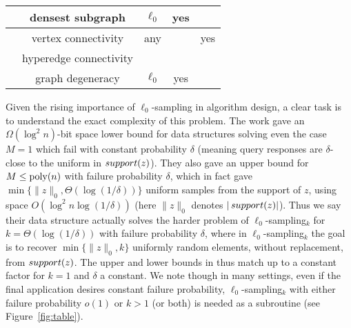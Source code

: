 \begin{figure*}[t]
\begin{center}
\begin{tabular}{|c|c|c|c|c|}
\hline
\cite{EsfandiariHW16} & densest subgraph & $\ell_0$ & yes & \\
\hline
\cite{GuhaMT15} & vertex connectivity & any & & yes\\
 & hyperedge connectivity &  & & \\
\hline
\cite{FarachColtonT16} & graph degeneracy & $\ell_0$ & yes & \\
\hline
\end{tabular}
\caption{Guarantees needed by various works using samplers as subroutines. The last two columns indicate whether the work needs to use a sampler that returns $k$ samples at a time when queried for some $k>1$, or for some subconstant failure probability $\delta$ even to achieve failure probability $1/3$ in the main application. The ``distribution'' column indicates the output distribution needed from the sampler for the application (``any'' means a \suppfind{} subroutine is sufficient, i.e.\ it suffices for a query to return any index $i$ for which $z_i\neq 0$).}\label{fig:table}
\end{center}
\end{figure*}

Given the rising importance of $\ell_0$-sampling in algorithm design, a clear task is to understand the exact complexity of this problem. The work \cite{JowhariST11} gave an $\Omega(\log^2 n)$-bit space lower bound for data structures solving even the case $M=1$ which fail with constant probability $\delta$ (meaning query responses are $\delta$-close to the uniform in $\mathop{support}(z)$). They also gave an upper bound for $M \le {\mathrm{poly}}(n)$ with failure probability $\delta$, which in fact gave $\min\{\|z\|_0, \Theta(\log(1/\delta))\}$ uniform samples from the support of $z$, using space $O(\log^2 n \log(1/\delta))$ (here $\|z\|_0$ denotes $|\mathop{support}(z)|$). Thus we say their data structure actually solves the harder problem of $\ell_0$-sampling$_k$ for $k =\Theta(\log(1/\delta))$ with failure probability $\delta$, where in $\ell_0$-sampling$_k$ the goal is to recover $\min\{\|z\|_0, k\}$ uniformly random elements, without replacement, from $\mathop{support}(z)$.  The upper and lower bounds in \cite{JowhariST11} thus match up to a constant factor for $k = 1$ and $\delta$ a constant. We note though in many settings, even if the final application desires constant failure probability, $\ell_0$-sampling$_k$ with either failure probability $o(1)$ or $k>1$ (or both) is needed as a subroutine (see Figure~\ref{fig:table}).


